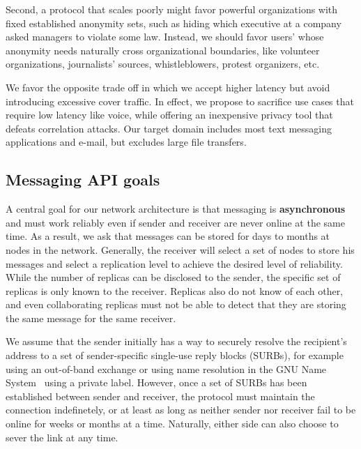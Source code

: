 \documentclass[twoside,letterpaper]{llncs}
\begin{document}
Second, a protocol that scales poorly might favor powerful
organizations with fixed established anonymity sets, such as hiding
which executive at a company asked managers to violate some law.
Instead, we should favor users' whose anonymity needs naturally
cross organizational boundaries, like volunteer organizations,
journalists' sources, whistleblowers, protest organizers, etc.

We favor the opposite trade off in which we accept higher latency but
avoid introducing excessive cover traffic. In effect, we propose to
sacrifice use cases that require low latency like voice, while
offering an inexpensive privacy tool that defeats correlation attacks.
Our target domain includes most text messaging applications and
e-mail, but excludes large file transfers.

\subsection{Messaging API goals} 

A central goal for our network architecture is that messaging is 
{\bf asynchronous} and must work reliably even if sender and receiver
are never online at the same time.  As a result, we ask that messages
can be stored for days to months at nodes in the network.  Generally,
the receiver will select a set of nodes to store his messages and
select a replication level to achieve the desired level of
reliability. While the number of replicas can be disclosed to the
sender, the specific set of replicas is only known to the receiver.
Replicas also do not know of each other, and even collaborating
replicas must not be able to detect that they are storing the same
message for the same receiver.

We assume that the sender initially has a way to securely resolve the
recipient's address to a set of sender-specific single-use reply
blocks (SURBs), for example using an out-of-band exchange or using
name resolution in the GNU Name System~\cite{gns} using a private
label.  However, once a set of SURBs has been established between
sender and receiver, the protocol must maintain the connection
indefinetely, or at least as long as neither sender nor receiver fail
to be online for weeks or months at a time.  Naturally, either side
can also choose to sever the link at any time.
\end{document}
